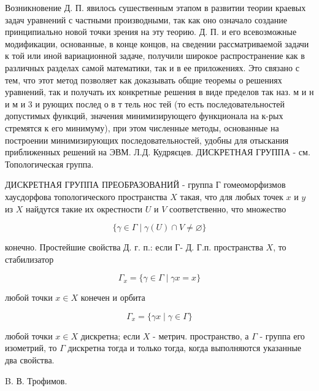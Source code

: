 \documentclass[10pt]{article}
\begin{document}
Возникновение Д. П. явилось сушественным этапом в развитии теории краевых задач уравнений с частными производными, так как оно означало создание принципиально новой точки зрения на эту теорию. Д. П. и его всевозможные модификации, основанные, в конце концов, на сведении рассматриваемой задачи к той или иной вариационной задаче, получили широкое распространение как в различных разделах самой математики, так и в ее приложениях. Это связано с тем, что этот метод позволяет как доказывать общие теоремы о решениях уравнений, так и получать их конкретные решения в виде пределов так наз. м и н и м и 3 и рующих послед о в т тель нос тей (то есть последовательностей допустимых функций, значения минимизирующего функционала на к-рых стремятся к его минимуму), при этом численные методы, основанные на построении минимизирующих последовательностей, удобны для отыскания приближенных решений на ЭВМ. Л.Д. Кудряєцев. ДИСКРЕТНАЯ ГРУППА - см. Топологическая группа.



ДИСКРЕТНАЯ ГРУППА ПРЕОБРАЗОВАНИЙ - группа Г гомеоморфизмов хаусдорфова топологического пространства $X$ такая, что для любых точек $x$ и $y$ из $X$ найдутся такие их окрестности $U$ и $V$ соответственно, что множество



\[

\{\gamma \in \Gamma \mid \gamma(U) \cap V \neq \varnothing\}

\]



конечно. Простейшие свойства Д. г. п.: если Г- Д. Г.п. пространства $X$, то стабилизатор



\[

\Gamma_{x}=\{\gamma \in \Gamma \mid \gamma x=x\}

\]



любой точки $x \in X$ конечен и орбита



\[

\Gamma_{x}=\{\gamma x \mid \gamma \in \Gamma\}

\]



любой точки $x \in X$ дискретна; если $X$ - метрич. пространство, а $\Gamma$ - группа его изометрий, то $\Gamma$ дискретна тогда и только тогда, когда выполняются указанные два свойства.



B. В. Трофимов.
\end{document}
